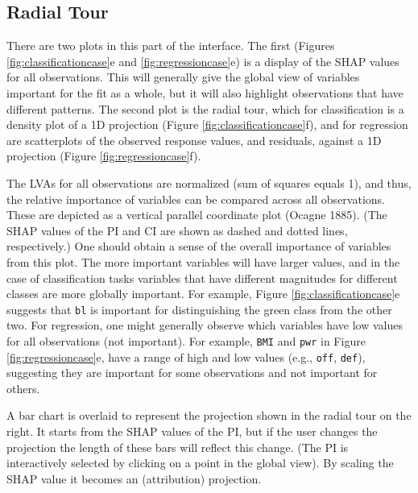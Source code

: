 \documentclass[
]{article}
\begin{document}
\hypertarget{radial-tour}{%
\subsection{Radial Tour}\label{radial-tour}}

There are two plots in this part of the interface. The first (Figures \ref{fig:classificationcase}e and \ref{fig:regressioncase}e) is a display of the SHAP values for all observations. This will generally give the global view of variables important for the fit as a whole, but it will also highlight observations that have different patterns. The second plot is the radial tour, which for classification is a density plot of a 1D projection (Figure \ref{fig:classificationcase}f), and for regression are scatterplots of the observed response values, and residuals, against a 1D projection (Figure \ref{fig:regressioncase}f).

The LVAs for all observations are normalized (sum of squares equals 1), and thus, the relative importance of variables can be compared across all observations. These are depicted as a vertical parallel coordinate plot (Ocagne 1885). (The SHAP values of the PI and CI are shown as dashed and dotted lines, respectively.) One should obtain a sense of the overall importance of variables from this plot. The more important variables will have larger values, and in the case of classification tasks variables that have different magnitudes for different classes are more globally important. For example, Figure \ref{fig:classificationcase}e suggests that \texttt{bl} is important for distinguishing the green class from the other two. For regression, one might generally observe which variables have low values for all observations (not important). For example, \texttt{BMI} and \texttt{pwr} in Figure \ref{fig:regressioncase}e, have a range of high and low values (e.g., \texttt{off}, \texttt{def}), suggesting they are important for some observations and not important for others.

A bar chart is overlaid to represent the projection shown in the radial tour on the right. It starts from the SHAP values of the PI, but if the user changes the projection the length of these bars will reflect this change. (The PI is interactively selected by clicking on a point in the global view). By scaling the SHAP value it becomes an (attribution) projection.
\end{document}

